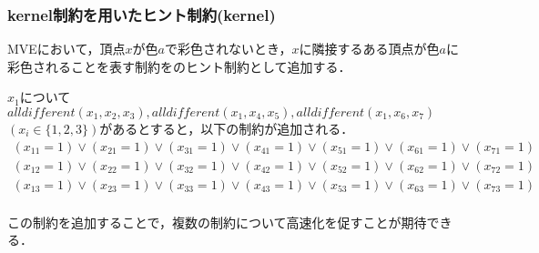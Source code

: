 \begin{frame}
    \frametitle{kernel制約を用いたヒント制約(kernel)}
    MVEにおいて，頂点$x$が色$a$で彩色されないとき，$x$に隣接するある頂点が色$a$に彩色されることを表す制約を{\alldifferent}のヒント制約として追加する．
    \begin{exampleblock}{}
        $x_1$について
        $alldifferent(x_1,x_2,x_3),alldifferent(x_1,x_4,x_5),alldifferent(x_1,x_6,x_7)$\\ $(x_i \in \{1,2,3\})$があるとすると，以下の制約が追加される．
        {\fontsize{10pt}{0pt}\selectfont
        \begin{eqnarray*}
            (x_{11} = 1) \lor (x_{21} = 1) \lor (x_{31} = 1) \lor (x_{41} = 1) \lor (x_{51} = 1) \lor (x_{61} = 1) \lor (x_{71} = 1)\\
            (x_{12} = 1) \lor (x_{22} = 1) \lor (x_{32} = 1) \lor (x_{42} = 1) \lor (x_{52} = 1) \lor (x_{62} = 1) \lor (x_{72} = 1)\\
            (x_{13} = 1) \lor (x_{23} = 1) \lor (x_{33} = 1) \lor (x_{43} = 1) \lor (x_{53} = 1) \lor (x_{63} = 1) \lor (x_{73} = 1)\\
        \end{eqnarray*}
    }
    \end{exampleblock}
    この制約を追加することで，複数の{\alldifferent}制約について高速化を促すことが期待できる．
\end{frame}


